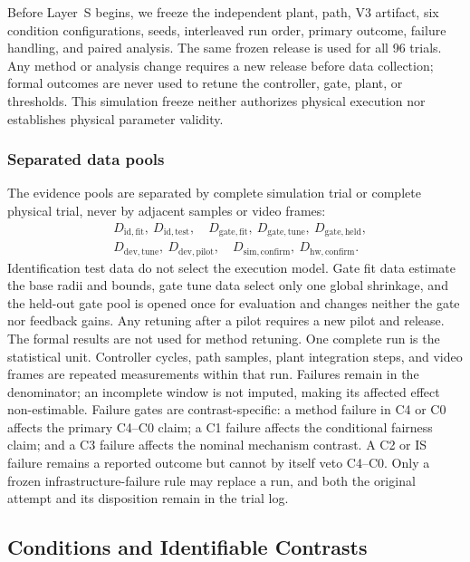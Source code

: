 Before Layer~S begins, we freeze the independent plant, path, V3 artifact, six
condition configurations, seeds, interleaved run order, primary outcome,
failure handling, and paired analysis.  The same frozen release is used for all
96 trials.  Any method or analysis change requires a new release before data
collection; formal outcomes are never used to retune the controller, gate,
plant, or thresholds.  This simulation freeze neither authorizes physical
execution nor establishes physical parameter validity.

\subsubsection{Separated data pools}

The evidence pools are separated by complete simulation trial or complete
physical trial, never by adjacent samples or video frames:
\begin{equation}
\begin{split}
  &D_{\mathrm{id,fit}},\ D_{\mathrm{id,test}},\quad
  D_{\mathrm{gate,fit}},\ D_{\mathrm{gate,tune}},\
  D_{\mathrm{gate,held}},\\
  &D_{\mathrm{dev,tune}},\ D_{\mathrm{dev,pilot}},\quad
  D_{\mathrm{sim,confirm}},\ D_{\mathrm{hw,confirm}}.
\end{split}
\label{eq:data_pools}
\end{equation}
Identification test data do not select the execution model.  Gate fit data
estimate the base radii and bounds, gate tune data select only one global
shrinkage, and the held-out gate pool is opened once for evaluation and changes
neither the gate nor feedback gains.  Any retuning after a pilot requires a new
pilot and release.  The formal results are not used for method retuning. One
complete run is the statistical unit.
Controller cycles, path samples, plant integration steps, and video frames are
repeated measurements within that run. Failures remain in the denominator; an
incomplete window is not imputed, making its affected effect non-estimable.
Failure gates
are contrast-specific: a method failure in C4 or C0 affects the primary
C4--C0 claim; a C1 failure affects the conditional fairness claim; and a C3
failure affects the nominal mechanism contrast.  A C2 or IS failure remains a
reported outcome but cannot by itself veto C4--C0.  Only a frozen
infrastructure-failure rule may replace a run, and both the original attempt
and its disposition remain in the trial log.

\subsection{Conditions and Identifiable Contrasts}

